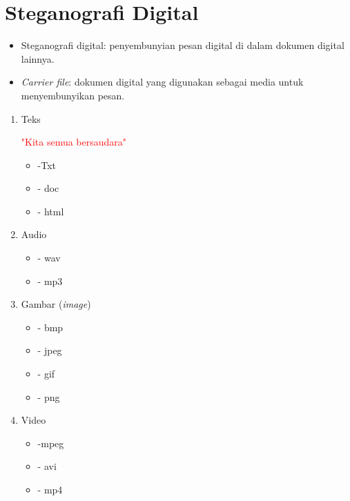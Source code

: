 \documentclass{article}
\begin{document}

\section*{Steganografi Digital}

\begin{itemize}
    \item Steganografi digital: penyembunyian pesan digital di dalam dokumen digital lainnya.
    \item \textit{Carrier file}: dokumen digital yang digunakan sebagai media untuk menyembunyikan pesan.
\end{itemize}

\vspace{53.46mm}

\begin{enumerate}
    \item Teks
    
    \textcolor{red}{"Kita semua bersaudara"}
    
    \begin{itemize}
        \item -Txt
        \item - doc
        \item - html
    \end{itemize}
    
    \vspace{10mm}
    
    \item Audio
    
    \vspace{5mm}
    
    \begin{itemize}
        \item - wav
        \item - mp3
    \end{itemize}

\vspace{18.71mm}

    \item Gambar (\textit{image})
    
    \begin{itemize}
        \item - bmp
        \item - jpeg
        \item - gif
        \item - png
    \end{itemize}
    
    \vspace{10mm}
    
    \item Video
    
    \begin{itemize}
        \item -mpeg
        \item - avi
        \item - mp4
    \end{itemize}
\end{enumerate}
\end{document}
